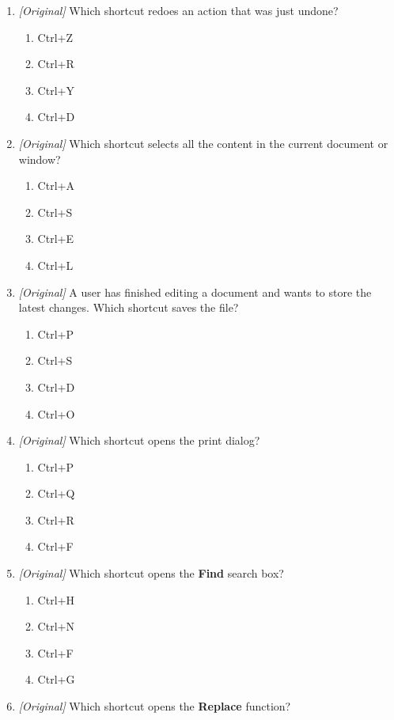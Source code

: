 \begin{enumerate}[label=\textbf{Q\arabic*.}, leftmargin=*]
\item \textit{[Original]} Which shortcut redoes an action that was just
  undone?
  \begin{enumerate}[label=\Alph*.]
    \item Ctrl+Z
    \item Ctrl+R
    \item Ctrl+Y
    \item Ctrl+D
  \end{enumerate}
\item \textit{[Original]} Which shortcut selects all the content in the
  current document or window?
  \begin{enumerate}[label=\Alph*.]
    \item Ctrl+A
    \item Ctrl+S
    \item Ctrl+E
    \item Ctrl+L
  \end{enumerate}
\item \textit{[Original]} A user has finished editing a document and wants to
  store the latest changes. Which shortcut saves the file?
  \begin{enumerate}[label=\Alph*.]
    \item Ctrl+P
    \item Ctrl+S
    \item Ctrl+D
    \item Ctrl+O
  \end{enumerate}
\item \textit{[Original]} Which shortcut opens the print dialog?
  \begin{enumerate}[label=\Alph*.]
    \item Ctrl+P
    \item Ctrl+Q
    \item Ctrl+R
    \item Ctrl+F
  \end{enumerate}
\item \textit{[Original]} Which shortcut opens the \textbf{Find} search box?
  \begin{enumerate}[label=\Alph*.]
    \item Ctrl+H
    \item Ctrl+N
    \item Ctrl+F
    \item Ctrl+G
  \end{enumerate}
\item \textit{[Original]} Which shortcut opens the \textbf{Replace} function?
  \begin{enumerate}[label=\Alph*.]

\end{enumerate}
\end{enumerate}
